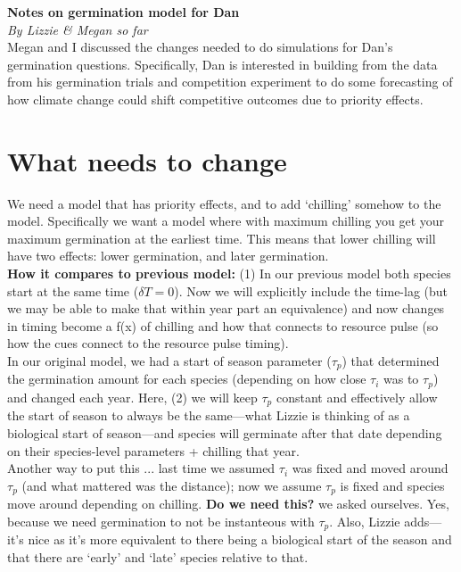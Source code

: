 \documentclass[11pt,letter]{article}
\begin{document}

\renewcommand{\refname}{\CHead{}}


{\bf Notes on germination model for Dan}\\
\emph{By Lizzie \& Megan so far}\\

Megan and I discussed the changes needed to do simulations for Dan's germination questions. Specifically, Dan is interested in building from the data from his germination trials and competition experiment to do some forecasting of how climate change could shift competitive outcomes due to priority effects.

\section{What needs to change}

We need a model that has priority effects, and to add `chilling' somehow to the model. Specifically we want a model where with maximum chilling you get your maximum germination at the earliest time. This means that lower chilling will have two effects: lower germination, and later germination. \\

{\bf How it compares to previous model:} 
(1) In our previous model both species start at the same time ($\delta T = 0$). Now we will explicitly include the time-lag (but we may be able to make that within year part an equivalence) and now changes in timing become a f(x) of chilling and how that connects to resource pulse (so how the cues connect to the resource pulse timing).\\

In our original model, we had a start of season parameter ($\tau_p$) that determined the germination amount for each species (depending on how close $\tau_i$ was to $\tau_p$) and changed each year. Here, (2) we will keep $\tau_p$ constant and effectively allow the start of season to always be the same---what Lizzie is thinking of as a biological start of season---and species will germinate after that date depending on their species-level parameters + chilling that year. \\

Another way to put this ... last time we assumed $\tau_i$ was fixed and moved around $\tau_p$ (and what mattered was the distance); now we assume $\tau_p$ is fixed and species move around depending on chilling. {\bf Do we need this?} we asked ourselves. Yes, because we need germination to not be instanteous with $\tau_p$. Also, Lizzie adds---it's nice as it's more equivalent to there being a biological start of the season and that there are `early' and `late' species relative to that.
\end{document}
